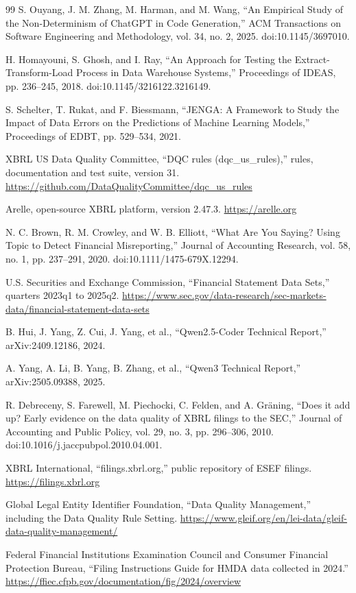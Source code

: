 \documentclass[11pt,a4paper]{article}
\begin{document}
\begin{thebibliography}{99}
 S. Ouyang, J. M. Zhang, M. Harman, and M. Wang, ``An Empirical Study of the Non-Determinism of ChatGPT in Code Generation,'' ACM Transactions on Software Engineering and Methodology, vol. 34, no. 2, 2025. doi:10.1145/3697010.

 H. Homayouni, S. Ghosh, and I. Ray, ``An Approach for Testing the Extract-Transform-Load Process in Data Warehouse Systems,'' Proceedings of IDEAS, pp. 236--245, 2018. doi:10.1145/3216122.3216149.

 S. Schelter, T. Rukat, and F. Biessmann, ``JENGA: A Framework to Study the Impact of Data Errors on the Predictions of Machine Learning Models,'' Proceedings of EDBT, pp. 529--534, 2021.

 XBRL US Data Quality Committee, ``DQC rules (dqc\_us\_rules),'' rules, documentation and test suite, version 31. \url{https://github.com/DataQualityCommittee/dqc_us_rules}

 Arelle, open-source XBRL platform, version 2.47.3. \url{https://arelle.org}

 N. C. Brown, R. M. Crowley, and W. B. Elliott, ``What Are You Saying? Using Topic to Detect Financial Misreporting,'' Journal of Accounting Research, vol. 58, no. 1, pp. 237--291, 2020. doi:10.1111/1475-679X.12294.

 U.S. Securities and Exchange Commission, ``Financial Statement Data Sets,'' quarters 2023q1 to 2025q2. \url{https://www.sec.gov/data-research/sec-markets-data/financial-statement-data-sets}

 B. Hui, J. Yang, Z. Cui, J. Yang, et al., ``Qwen2.5-Coder Technical Report,'' arXiv:2409.12186, 2024.

 A. Yang, A. Li, B. Yang, B. Zhang, et al., ``Qwen3 Technical Report,'' arXiv:2505.09388, 2025.

 R. Debreceny, S. Farewell, M. Piechocki, C. Felden, and A. Gr\"aning, ``Does it add up? Early evidence on the data quality of XBRL filings to the SEC,'' Journal of Accounting and Public Policy, vol. 29, no. 3, pp. 296--306, 2010. doi:10.1016/j.jaccpubpol.2010.04.001.

 XBRL International, ``filings.xbrl.org,'' public repository of ESEF filings. \url{https://filings.xbrl.org}

 Global Legal Entity Identifier Foundation, ``Data Quality Management,'' including the Data Quality Rule Setting. \url{https://www.gleif.org/en/lei-data/gleif-data-quality-management/}

 Federal Financial Institutions Examination Council and Consumer Financial Protection Bureau, ``Filing Instructions Guide for HMDA data collected in 2024.'' \url{https://ffiec.cfpb.gov/documentation/fig/2024/overview}

\end{thebibliography}
\end{document}
